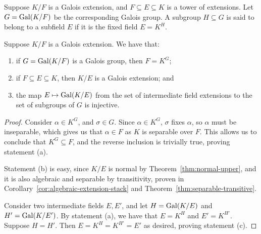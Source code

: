 \begin{definition}
    Suppose \(K/F\) is a Galois extension,
    and \(F \subseteq E \subseteq K\) is a tower of extensions.
    Let \(G = \operatorname{Gal}(K/F)\) be the corresponding Galois group.
    A subgroup \(H \subseteq G\) is said to belong to a subfield \(E\)
    if it is the fixed field \(E = K^H\).
\end{definition}
\begin{lemma}\label{lem:galois-injective}
    Suppose \(K/F\) is a Galois extension.
    We have that:
    \begin{enumerate}[label={(\alph*)}, itemsep=0mm]
        \item if \(G = \operatorname{Gal}(K/F)\) is a Galois group, then \(F = K^G\);
        \item if \(F \subseteq E \subseteq K\), then \(K/E\) is a Galois extension; and
        \item the map \(E \mapsto \operatorname{Gal}(K/E)\) from the set of intermediate field extensions
            to the set of subgroups of \(G\) is injective.
    \end{enumerate}
\end{lemma}
\begin{proof}
    Consider \(\alpha \in K^G\), and \(\sigma \in G\).
    Since \(\alpha \in K^G\), \(\sigma\) fixes \(\alpha\),
    so \(\alpha\) must be inseparable,
    which gives us that \(\alpha \in F\) as \(K\) is separable over \(F\).
    This allows us to conclude that \(K^G \subseteq F\), and the reverse inclusion is trivially true,
    proving statement (a).

    Statement (b) is easy, since \(K/E\) is normal by Theorem~\ref{thm:normal-upper},
    and it is also algebraic and separable by transitivity,
    proven in Corollary~\ref{cor:algebraic-extension-stack} and Theorem~\ref{thm:separable-transitive}.

    Consider two intermediate fields \(E,E'\),
    and let \(H = \operatorname{Gal}(K/E)\) and \(H' = \operatorname{Gal}(K/E')\).
    By statement (a), we have that \(E = K^H\) and \(E' = K^{H'}\).
    Suppose \(H = H'\).
    Then \(E = K^H = K^{H'} = E'\) as desired,
    proving statement (c).
\end{proof}
